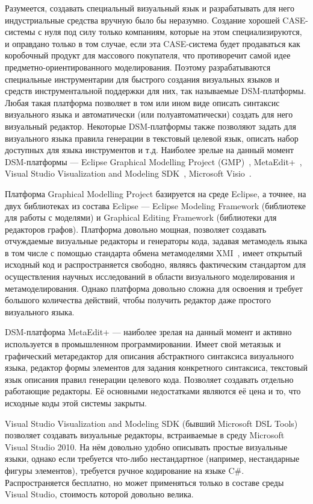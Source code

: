 \documentclass[a4paper]{article}
\begin{document}
Разумеется, создавать специальный визуальный язык и разрабатывать для него индустриальные средства вручную было бы неразумно. Создание хорошей CASE-системы с нуля под силу только компаниям, которые на этом специализируются, и оправдано только в том случае, если эта CASE-система будет продаваться как коробочный продукт для массового покупателя, что противоречит самой идее предметно-ориентированного моделирования. Поэтому разрабатываются специальные инструментарии для быстрого создания визуальных языков и средств инструментальной поддержки для них, так называемые DSM-платформы. Любая такая платформа позволяет в том или ином виде описать синтаксис визуального языка и автоматически (или полуавтоматически) создать для него визуальный редактор. Некоторые DSM-платформы также позволяют задать для визуального языка правила генерации в текстовый целевой язык, описать набор доступных для языка инструментов и т.д. Наиболее зрелые на данный момент DSM-платформы --- Eclipse Graphical Modelling Project (GMP)~\cite{gmp}, MetaEdit+~\cite{metaEditPlus}, Visual Studio Visualization and Modeling SDK~\cite{vsvmsdk}, Microsoft Visio~\cite{visio}. 

Платформа Graphical Modelling Project базируется на среде Eclipse, а точнее, на двух библиотеках из состава Eclipse --- Eclipse Modeling Framework (библиотеке для работы с моделями) и Graphical Editing Framework (библиотеки для редакторов графов). Платформа довольно мощная, позволяет создавать отчуждаемые визуальные редакторы и генераторы кода, задавая метамодель языка в том числе с помощью стандарта обмена метамоделями XMI~\cite{xmi}, имеет открытый исходный код и распространяется свободно, являясь фактическим стандартом для осуществления научных исследований в области визуального моделирования и метамоделирования. Однако платформа довольно сложна для освоения и требует большого количества действий, чтобы получить редактор даже простого визуального языка. 

DSM-платформа MetaEdit+ --- наиболее зрелая на данный момент и активно используется в промышленном программировании. Имеет свой метаязык и графический метаредактор для описания абстрактного синтаксиса визуального языка, редактор формы элементов для задания конкретного синтаксиса, текстовый язык описания правил генерации целевого кода. Позволяет создавать отдельно работающие редакторы. Её основными недостатками являются её цена и то, что исходные коды этой системы закрыты.

Visual Studio Visualization and Modeling SDK (бывший Microsoft DSL Tools) позволяет создавать визуальные редакторы, встраиваемые в среду Microsoft Visual Studio 2010. На нём довольно удобно описывать простые визуальные языки, однако если требуется что-либо нестандартное (например, нестандарные фигуры элементов), требуется ручное кодирование на языке C\#. Распространяется бесплатно, но может применяться только в составе среды Visual Studio, стоимость которой довольно велика.
\end{document}
